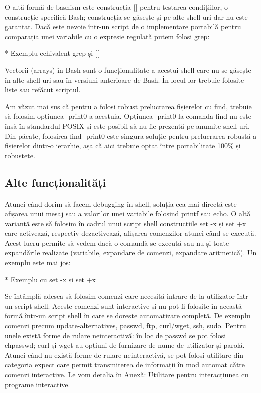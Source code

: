 O altă formă de bashism este construcția [[ pentru testarea condițiilor, o
construcție specifică Bash; construcția se găsește și pe alte shell-uri dar nu
este garantat. Dacă este nevoie într-un script de o implementare portabilă
pentru comparația unei variabile cu o expresie regulată putem folosi grep:

* Exemplu echivalent grep și [[

Vectorii (arrays) în Bash sunt o funcționalitate a acestui shell care nu se
găsește în alte shell-uri sau în versiuni anterioare de Bash. În locul lor
trebuie folosite liste sau refăcut scriptul.

Am văzut mai sus că pentru a folosi robust prelucrarea fișierelor cu find,
trebuie să folosim opțiunea -print0 a acestuia. Opțiunea -print0 la comanda find
nu este însă în standardul POSIX și este posibil să nu fie prezentă pe anumite
shell-uri. Din păcate, folosirea find -print0 este singura soluție pentru
prelucrarea robustă a fișierelor dintr-o ierarhie, așa că aici trebuie optat
între portabilitate 100\% și robustețe.

\subsection{Alte funcționalități}
\label{sec:script-advancedfunc-other}

Atunci când dorim să facem debugging în shell, soluția cea mai directă este
afișarea unui mesaj sau a valorilor unei variabile folosind printf sau echo. O
altă variantă este să folosim în cadrul unui script shell construcțiile set -x
și set +x care activează, respectiv dezactivează, afișarea comenzilor atunci
când se execută. Acest lucru permite să vedem dacă o comandă se execută sau nu
și toate expandările realizate (variabile, expandare de comenzi, expandare
aritmetică). Un exemplu este mai jos:

* Exemplu cu set -x și set +x

Se întâmplă adesea să folosim comenzi care necesită intrare de la utilizator
într-un script shell. Aceste comenzi sunt interactive și nu pot fi folosite în
această formă într-un script shell în care se dorește automatizare completă. De
exemplu comenzi precum update-alternatives, passwd, ftp, curl/wget, ssh, sudo.
Pentru unele există forme de rulare neinteractivă: în loc de passwd se pot
folosi chpasswd; curl și wget au opțiuni de furnizare de nume de utilizator și
parolă. Atunci când nu există forme de rulare neinteractivă, se pot folosi
utilitare din categoria expect care permit transmiterea de informații în mod
automat către comenzi interactive. Le vom detalia în Anexă: Utilitare pentru
interacțiunea cu programe interactive.

